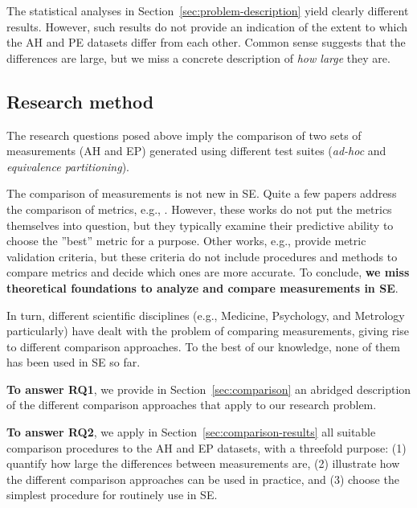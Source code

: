The statistical analyses in Section~\ref{sec:problem-description} yield clearly different results. However, such results do not provide an indication of the extent to which the AH and PE datasets differ from each other. Common sense suggests that the differences are large, but we miss a concrete description of \textit{how large} they are.

\subsection{Research method}\label{sec:method}

The research questions posed above imply the comparison of two sets of measurements (AH and EP) generated using different test suites (\textit{ad-hoc} and \textit{equivalence partitioning}). 

The comparison of measurements is not new in SE. Quite a few papers address the comparison of metrics, e.g., \cite{basili1981evaluating,zhang2007performance,zhao1998comparison,jiang2008comparing,di2007comparing}. However, these works do not put the metrics themselves into question, but they typically examine their predictive ability to choose the ''best'' metric for a purpose. Other works, e.g., \cite{meneely2012validating} provide metric validation criteria, but these criteria do not include procedures and methods to compare metrics and decide which ones are more accurate. To conclude, \textbf{we miss theoretical foundations to analyze and compare measurements in SE}.

In turn, different scientific disciplines (e.g., Medicine, Psychology, and Metrology particularly) have dealt with the problem of comparing measurements, giving rise to different comparison approaches. To the best of our knowledge, none of them has been used in SE so far.

\textbf{To answer RQ1}, we provide in Section~\ref{sec:comparison} an abridged description of the different comparison approaches that apply to our research problem.

\textbf{To answer RQ2}, we apply in Section~\ref{sec:comparison-results} all suitable comparison procedures to the AH and EP datasets, with a threefold purpose: (1) quantify how large the differences between measurements are, (2) illustrate how the different comparison approaches can be used in practice, and (3) choose the simplest procedure for routinely use in SE.